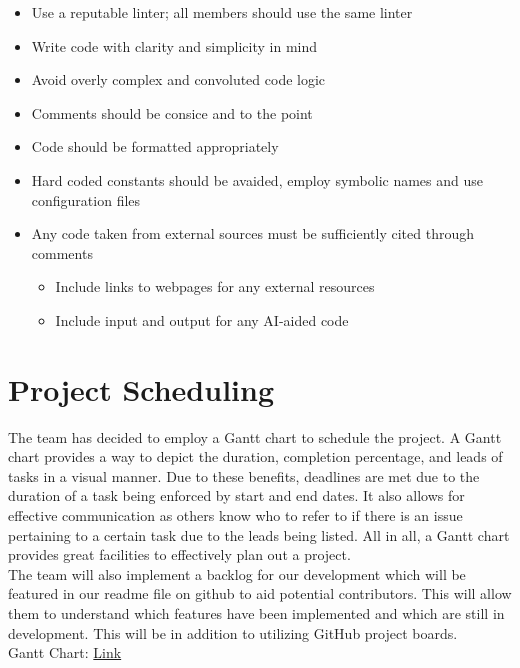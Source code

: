 \documentclass{article}
\begin{document}
\begin{itemize}
\item Use a reputable linter; all members should use the same linter
\item Write code with clarity and simplicity in mind
\item Avoid overly complex and convoluted code logic
\item Comments should be consice and to the point
\item Code should be formatted appropriately
\item Hard coded constants should be avaided, employ symbolic names and use configuration files 
\item Any code taken from external sources must be sufficiently cited through comments
\begin{itemize}
  \item Include links to webpages for any external resources
  \item Include input and output for any AI-aided code
\end{itemize}


\end{itemize}


\newpage

\section{Project Scheduling}

The team has decided to employ a Gantt chart to schedule the project. A Gantt chart provides a way to depict the duration, completion percentage, and leads of tasks in a visual manner. Due to these benefits, deadlines are met due to the duration of a task being enforced by start and end dates. It also allows for effective communication as others know who to refer to if there is an issue pertaining to a certain task due to the leads being listed. All in all, a Gantt chart provides great facilities to effectively plan out a project. \\

The team will also implement a backlog for our development which will be featured in our readme file on github to aid potential contributors. This will allow them to understand which features have been implemented and which are still in development. This will be in addition to utilizing GitHub project boards.\\

Gantt Chart: \href{https://mcmasteru365-my.sharepoint.com/:x:/g/personal/bhatth14_mcmaster_ca/ESjvjVJfZflPvcV8xfFiPxEBNGdj_fdNWy0EyGGiqIbAEw?e=9wUfQj}{Link}
\end{document}

